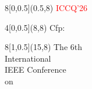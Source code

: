 \documentclass{ad}
\begin{document}
\begin{textblock}{8}[0,0.5](0.5,8)
\textcolor{red}{\fontsize{64}{64}\selectfont ICCQ'26}
\end{textblock}

\begin{textblock}{4}[0,0.5](8,8)
\fontsize{16}{16}\selectfont
Cfp: 
\end{textblock}

\begin{textblock}{8}[1,0.5](15,8)
\fontsize{16}{16}\selectfont
\raggedleft
The 6th \\
International \\
IEEE Conference \\
on 
\end{textblock}
\end{document}
